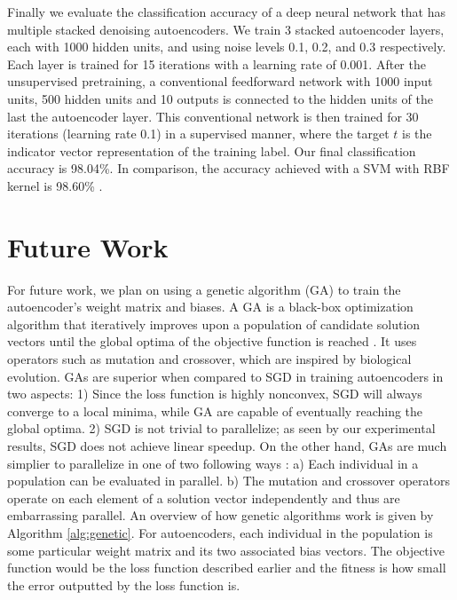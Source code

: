 \documentclass[conference]{IEEEtran}
\begin{document}
Finally we evaluate the classification accuracy of a deep neural network that has multiple stacked denoising autoencoders. We train 3 stacked autoencoder layers, each with 1000 hidden units, and using noise levels 0.1, 0.2, and 0.3 respectively. Each layer is trained for 15 iterations with a learning rate of 0.001. After the unsupervised pretraining, a conventional feedforward network with 1000 input units, 500 hidden units and 10 outputs is connected to the hidden units of the last the autoencoder layer. This conventional network is then trained for 30 iterations (learning rate 0.1) in a supervised manner, where the target $t$ is the indicator vector representation of the training label. Our final classification accuracy is 98.04\%. In comparison, the accuracy achieved with a SVM with RBF kernel is 98.60\% \cite{vincent2010stacked}. 

\section{Future Work}
For future work, we plan on using a genetic algorithm (GA) to train the autoencoder's weight matrix and biases. A GA is a black-box optimization algorithm that iteratively improves upon a population of candidate solution vectors until the global optima of the objective function is reached \cite{srinivas1994genetic}. It uses operators such as mutation and crossover, which are inspired by biological evolution. GAs are superior when compared to SGD in training autoencoders in two aspects: 1) Since the loss function is highly nonconvex, SGD will always converge to a local minima, while GA are capable of eventually reaching the global optima. 2) SGD is not trivial to parallelize; as seen by our experimental results, SGD does not achieve linear speedup. On the other hand, GAs are much simplier to parallelize in one of two following ways \cite{cantu1998survey}: a) Each individual in a population can be evaluated in parallel. b) The mutation and crossover operators operate on each element of a solution vector independently and thus are embarrassing parallel. An overview of how genetic algorithms work is given by Algorithm \ref{alg:genetic}. For autoencoders, each individual in the population is some particular weight matrix and its two associated bias vectors. The objective function would be the loss function described earlier and the fitness is how small the error outputted by the loss function is. 
\end{document}
